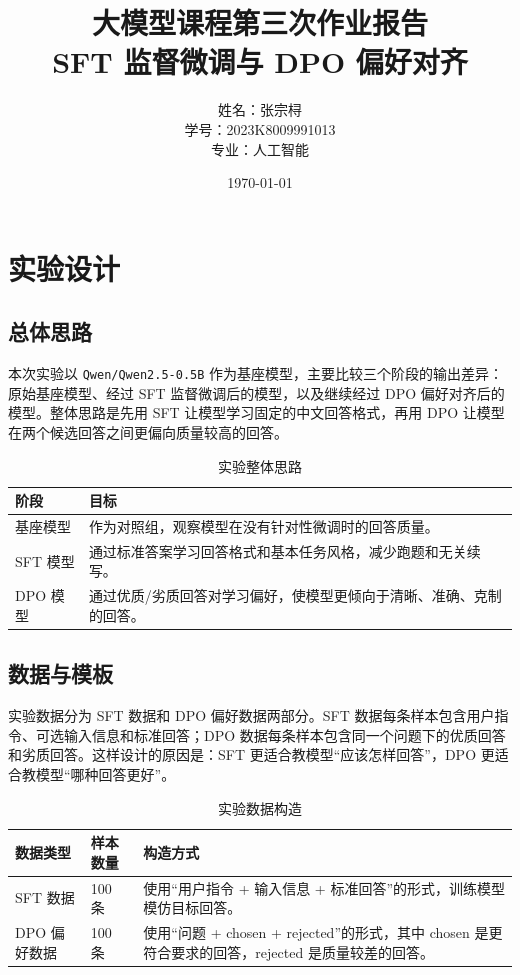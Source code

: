 \documentclass[a4paper,12pt]{ctexart}
\title{\textbf{大模型课程第三次作业报告}\\SFT 监督微调与 DPO 偏好对齐}
\author{姓名：张宗桪 \\ 学号：2023K8009991013 \\ 专业：人工智能}
\date{\today}
\begin{document}
\pagestyle{plain}

\maketitle
\thispagestyle{empty}
\newpage

\tableofcontents
\newpage

\section{实验设计}

\subsection{总体思路}

本次实验以 \texttt{Qwen/Qwen2.5-0.5B} 作为基座模型，主要比较三个阶段的输出差异：原始基座模型、经过 SFT 监督微调后的模型，以及继续经过 DPO 偏好对齐后的模型。整体思路是先用 SFT 让模型学习固定的中文回答格式，再用 DPO 让模型在两个候选回答之间更偏向质量较高的回答。

\begin{table}[H]
    \centering
    \begin{tabularx}{\textwidth}{L{0.23\textwidth}Y}
        \toprule
        阶段 & 目标 \\
        \midrule
        基座模型 & 作为对照组，观察模型在没有针对性微调时的回答质量。 \\
        SFT 模型 & 通过标准答案学习回答格式和基本任务风格，减少跑题和无关续写。 \\
        DPO 模型 & 通过优质/劣质回答对学习偏好，使模型更倾向于清晰、准确、克制的回答。 \\
        \bottomrule
    \end{tabularx}
    \caption{实验整体思路}
\end{table}

\subsection{数据与模板}

实验数据分为 SFT 数据和 DPO 偏好数据两部分。SFT 数据每条样本包含用户指令、可选输入信息和标准回答；DPO 数据每条样本包含同一个问题下的优质回答和劣质回答。这样设计的原因是：SFT 更适合教模型“应该怎样回答”，DPO 更适合教模型“哪种回答更好”。

\begin{table}[H]
    \centering
    \begin{tabularx}{\textwidth}{L{0.22\textwidth}L{0.18\textwidth}Y}
        \toprule
        数据类型 & 样本数量 & 构造方式 \\
        \midrule
        SFT 数据 & 100 条 & 使用“用户指令 + 输入信息 + 标准回答”的形式，训练模型模仿目标回答。 \\
        DPO 偏好数据 & 100 条 & 使用“问题 + chosen + rejected”的形式，其中 chosen 是更符合要求的回答，rejected 是质量较差的回答。 \\
        \bottomrule
    \end{tabularx}
    \caption{实验数据构造}
\end{table}
\end{document}
